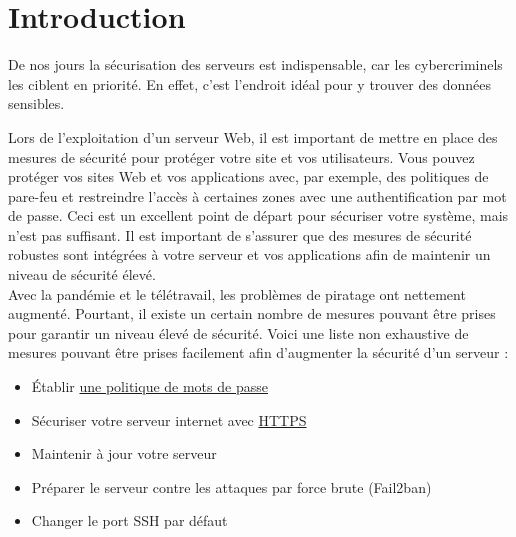 \section{Introduction}
De nos jours la sécurisation des serveurs est indispensable, car les cybercriminels les ciblent en priorité. En effet, c’est l’endroit idéal pour y trouver des données sensibles. 

Lors de l'exploitation d'un serveur Web, il est important de mettre en place des mesures de sécurité pour protéger votre site et vos utilisateurs. Vous pouvez protéger vos sites Web et vos applications avec, par exemple, des politiques de pare-feu et restreindre l'accès à certaines zones avec une authentification par mot de passe. Ceci est un excellent point de départ pour sécuriser votre système, mais n'est pas suffisant. Il est important de s’assurer que des mesures de sécurité robustes sont intégrées à votre serveur et vos applications afin de maintenir un niveau de sécurité élevé. \\
Avec la pandémie et le télétravail, les problèmes de piratage ont nettement augmenté. Pourtant, il existe un certain nombre de mesures pouvant être prises pour garantir un niveau élevé de sécurité. Voici une liste non exhaustive de mesures pouvant être prises facilement afin d'augmenter la sécurité d'un serveur : 
\begin{itemize}
    \item Établir  \hyperref[POLITIQUE]{une politique de mots de passe}
    \item Sécuriser votre serveur internet avec \hyperref[HTTPS]{HTTPS}
    \item Maintenir à jour votre serveur
    \item Préparer le serveur contre les attaques par force brute (Fail2ban)
    \item Changer le port SSH par défaut
\end{itemize}